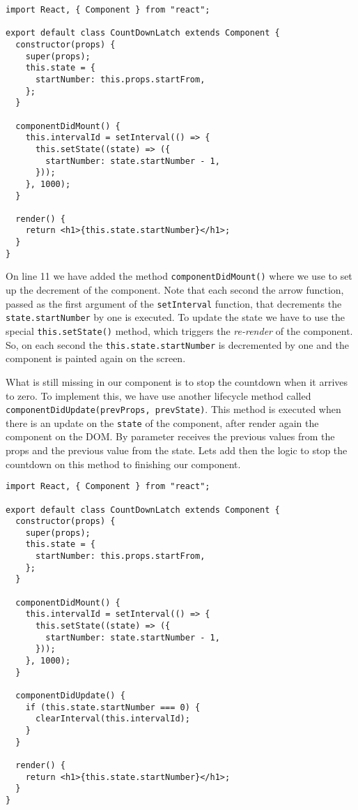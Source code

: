 \documentclass[a4paper, oneside, titlepage, 12pt]{book}
\begin{document}
\begin{verbatim}
import React, { Component } from "react";

export default class CountDownLatch extends Component {
  constructor(props) {
    super(props);
    this.state = {
      startNumber: this.props.startFrom,
    };
  }

  componentDidMount() {
    this.intervalId = setInterval(() => {
      this.setState((state) => ({
        startNumber: state.startNumber - 1,
      }));
    }, 1000);
  }
  
  render() {
    return <h1>{this.state.startNumber}</h1>;
  }
}
\end{verbatim}

On line 11 we have added the method \texttt{componentDidMount()} where we use to set up the decrement of the component. Note that each second the arrow function, passed as the first argument of the \texttt{setInterval} function, that decrements the \texttt{state.startNumber} by one is executed. To update the state we have to use the special \texttt{this.setState()} method, which triggers the \textit{re-render} of the component. So, on each second the \texttt{this.state.startNumber} is decremented by one and the component is painted again on the screen.
\newline

What is still missing in our component is to stop the countdown when it arrives to zero. To implement this, we have use another lifecycle method called \texttt{componentDidUpdate(prevProps, prevState)}. This method is executed when there is an update on the \texttt{state} of the component, after render again the component on the DOM. By  parameter receives the previous values from the props and the previous value from the state. Lets add then the logic to stop the countdown on this method to finishing our component.

\begin{verbatim}
import React, { Component } from "react";

export default class CountDownLatch extends Component {
  constructor(props) {
    super(props);
    this.state = {
      startNumber: this.props.startFrom,
    };
  }

  componentDidMount() {
    this.intervalId = setInterval(() => {
      this.setState((state) => ({
        startNumber: state.startNumber - 1,
      }));
    }, 1000);
  }

  componentDidUpdate() {
    if (this.state.startNumber === 0) {
      clearInterval(this.intervalId);
    }
  }
  
  render() {
    return <h1>{this.state.startNumber}</h1>;
  }
}
\end{verbatim}
\end{document}
